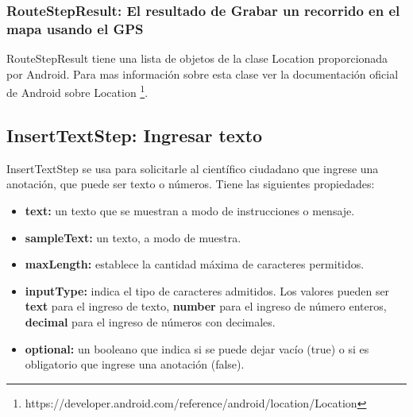 \subsubsection{RouteStepResult: El resultado de Grabar un recorrido en el mapa usando el GPS}
RouteStepResult tiene una lista de objetos de la clase Location proporcionada por Android.  Para
mas información sobre esta clase ver la documentación oficial de Android sobre Location \footnote{https://developer.android.com/reference/android/location/Location}.






\subsection{InsertTextStep: Ingresar texto}
InsertTextStep se usa para solicitarle al científico ciudadano que ingrese una anotación, que puede ser texto o números. Tiene las siguientes propiedades:

\begin{itemize}
\item \textbf{text:} un texto que se muestran a modo de instrucciones o mensaje.
\item \textbf{sampleText:} un texto, a modo de muestra.
\item \textbf{maxLength:} establece la cantidad máxima de caracteres permitidos.
\item \textbf{inputType:} indica el tipo de caracteres admitidos. Los valores pueden ser \textbf{text} para el ingreso de texto, \textbf{number} para el ingreso de número enteros, \textbf{decimal} para el ingreso de números con decimales.
\item \textbf{optional:} un booleano que indica si se puede dejar vacío (true) o si es obligatorio que ingrese una anotación (false).
\end{itemize}

